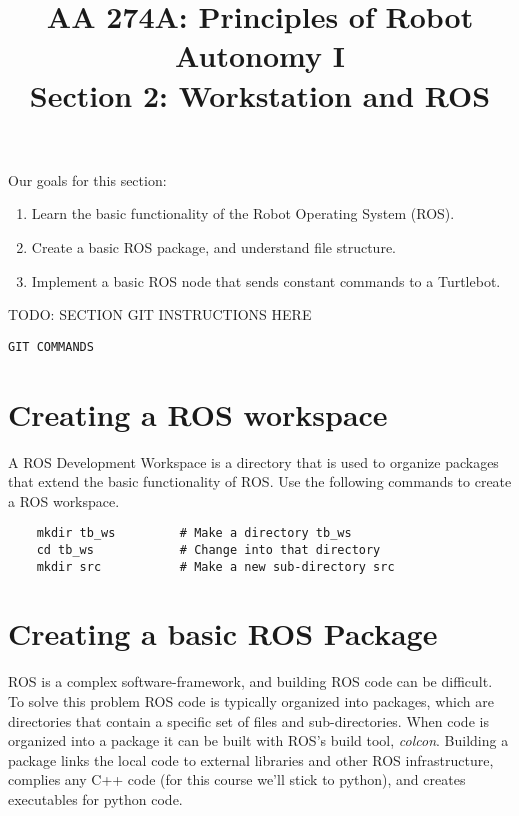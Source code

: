 \documentclass{article}
\title{AA 274A: Principles of Robot Autonomy I \\ Section 2: Workstation and ROS}
\date{}
\begin{document}
\maketitle
\pagestyle{fancy}

Our goals for this section:
\begin{enumerate}
    \item Learn the basic functionality of the Robot Operating System (ROS). 
    \item Create a basic ROS package, and understand file structure.
    \item Implement a basic ROS node that sends constant commands to a Turtlebot.
\end{enumerate}

TODO: SECTION GIT INSTRUCTIONS HERE
\begin{lstlisting}
GIT COMMANDS
\end{lstlisting}

\section{Creating a ROS workspace}
A ROS Development Workspace is a directory that is used to organize packages that extend the basic functionality of ROS. Use the following commands to create a ROS workspace.

\begin{lstlisting}
    mkdir tb_ws         # Make a directory tb_ws
    cd tb_ws            # Change into that directory 
    mkdir src           # Make a new sub-directory src
\end{lstlisting}



\section{Creating a basic ROS Package}
ROS is a complex software-framework, and building ROS code can be difficult. To solve this problem ROS code is typically organized into packages, which are directories that contain a specific set of files and sub-directories. When code is organized into a package it can be built with ROS's build tool, {\it colcon}. Building a package links the local code to external libraries and other ROS infrastructure, complies any C++ code (for this course we'll stick to python), and creates executables for python code. 
\begin{lstlisting}
    
\end{lstlisting}
\end{document}
